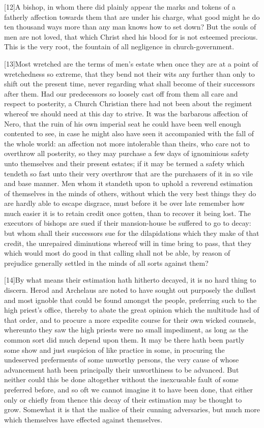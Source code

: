 [12]A bishop, in whom there did plainly appear the marks and tokens of a fatherly affection towards them that are under his charge, what good might he do ten thousand ways more than any man knows how to set down? But the souls of men are not loved, that which Christ shed his blood for is not esteemed precious. This is the very root, the fountain of all negligence in church-government.

[13]Most wretched are the terms of men’s estate when once they are at a point of wretchedness so extreme, that they bend not their wits any further than only to shift out the present time, never regarding what shall become of their successors after them. Had our predecessors so loosely cast off from them all care and respect to posterity, a Church Christian there had not been about the regiment whereof we should need at this day to strive. It was the barbarous affection of Nero, that the ruin of his own imperial seat he could have been well enough contented to see, in case he  might also have seen it accompanied with the fall of the whole world: an affection not more intolerable than theirs, who care not to overthrow all posterity, so they may purchase a few days of ignominious safety unto themselves and their present estates; if it may be termed a safety which tendeth so fast unto their very overthrow that are the purchasers of it in so vile and base manner. Men whom it standeth upon to uphold a reverend estimation of themselves in the minds of others, without which the very best things they do are hardly able to escape disgrace, must before it be over late remember how much easier it is to retain credit once gotten, than to recover it being lost. The executors of bishops are sued if their mansion-house be suffered to go to decay: but whom shall their successors sue for the dilapidations which they make of that credit, the unrepaired diminutions whereof will in time bring to pass, that they which would most do good in that calling shall not be able, by reason of prejudice generally settled in the minds of all sorts against them?

[14]By what means their estimation hath hitherto decayed, it is no hard thing to discern. Herod and Archelaus are noted to have sought out purposely the dullest and most ignoble that could be found amongst the people, preferring such to the high priest’s office, thereby to abate the great opinion which the multitude had of that order, and to procure a more expedite course for their own wicked counsels, whereunto they saw the high priests were no small impediment, as long as the common sort did much depend upon them. It may be there hath been partly some show and just suspicion of like practice in some, in procuring the undeserved preferments of some unworthy persons, the very cause of  whose advancement hath been principally their unworthiness to be advanced. But neither could this be done altogether without the inexcusable fault of some preferred before, and so oft we cannot imagine it to have been done, that either only or chiefly from thence this decay of their estimation may be thought to grow. Somewhat it is that the malice of their cunning adversaries, but much more which themselves have effected against themselves.

